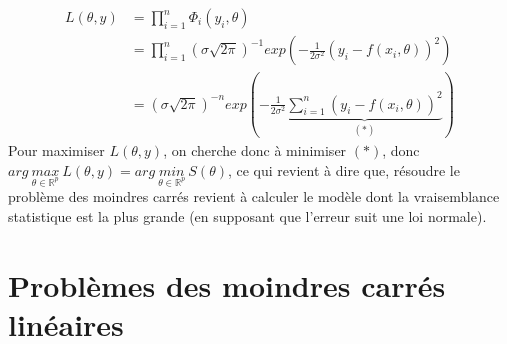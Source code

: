 \documentclass[a4paper,10pt]{report}
\begin{document}
\begin{align*}
L(\theta,y) & = \prod \limits_{i=1}^n \Phi_i(y_i, \theta) \\
			& = \prod \limits_{i=1}^n (\sigma \sqrt{2\pi})^{-1}exp\left( -\frac{1}{2\sigma^2} (y_i - f(x_i,\theta))^2 \right) \\
			& = (\sigma \sqrt{2\pi})^{-n}exp \left( -\frac{1}{2\sigma^2} \underbrace{\sum \limits_{i=1}^n(y_i - f(x_i,\theta))^2}_{(*)} \right)
\end{align*}
Pour maximiser $L(\theta,y)$, on cherche donc à minimiser $(*)$, donc $arg \ \underset{\theta \in \mathbb{R}^p}{max} \ L(\theta,y)=arg \ \underset{\theta \in \mathbb{R}^p}{min} \ S(\theta)$, ce qui revient à dire que, résoudre le problème des moindres carrés revient à calculer le modèle dont la vraisemblance statistique est la plus grande (en supposant que l'erreur suit une loi normale).

\section{Problèmes des moindres carrés linéaires}
\end{document}
